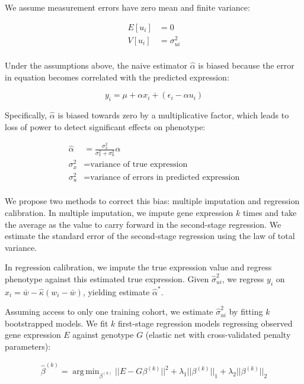 \documentclass{article}
\DeclareMathOperator*{\argmin}{arg\,min}
\begin{document}
We assume measurement errors have zero mean and finite variance:

\begin{align*}
  E[u_i] &= 0\\
  V[u_i] &= \sigma_{ui}^2\\
\end{align*}

Under the assumptions above, the naive estimator $\hat\alpha$ is biased because
the error in equation becomes correlated with the predicted expression:

\begin{equation}
  y_i = \mu + \alpha x_i + (\epsilon_i - \alpha u_i)
\end{equation}

Specifically, $\hat\alpha$ is biased towards zero by a multiplicative factor,
which leads to loss of power to detect significant effects on phenotype:

\begin{align*}
  \hat\alpha &= \frac{\sigma_x^2}{\sigma_x^2 + \sigma_u^2}\alpha\\
  \sigma_x^2 &= \text{variance of true expression}\\
  \sigma_u^2 &= \text{variance of errors in predicted expression}\\
\end{align*}

We propose two methods to correct this bias: multiple imputation and regression
calibration. In multiple imputation, we impute gene expression $k$ times and
take the average as the value to carry forward in the second-stage regression.
We estimate the standard error of the second-stage regression using the law of
total variance.

In regression calibration, we impute the true expression value and regress
phenotype against this estimated true expression. Given $\hat\sigma_{ui}^2$, we
regress $y_i$ on $\hat x_i = \bar w - \hat\kappa (w_i - \bar w)$, yielding
estimate $\hat\alpha^*$.

Assuming access to only one training cohort, we estimate $\hat\sigma_{ui}^2$ by
fitting $k$ bootstrapped models. We fit $k$ first-stage regression models
regressing observed gene expression $E$ against genotype $G$ (elastic net with
cross-validated penalty parameters):

\begin{align*}
    \hat\beta^{(k)} = \argmin_{\beta^{(k)}} ||E - G\beta^{(k)}||^2 +
    \lambda_1||\beta^{(k)}||_1 + \lambda_2||\beta^{(k)}||_2\\
\end{align*}
\end{document}
